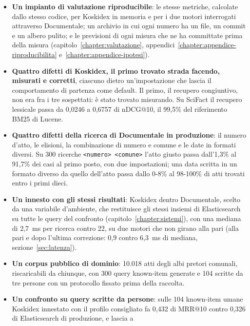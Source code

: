 \begin{itemize}
  \item \textbf{Un impianto di valutazione riproducibile}: le stesse metriche,
        calcolate dallo stesso codice, per Koskidex in memoria e per i due motori
        interrogati attraverso Documentale; un archivio in cui ogni numero ha un
        file, un commit e un albero pulito; e le previsioni di ogni misura che ne ha
        committate prima della misura (capitolo~\ref{chapter:valutazione},
        appendici~\ref{chapter:appendice-riproducibilita}
        e~\ref{chapter:appendice-ipotesi}).
  \item \textbf{Quattro difetti di Koskidex, il primo trovato strada facendo,
        misurati e corretti}, ciascuno dietro un'impostazione che lascia il
        comportamento di partenza come default. Il primo, il recupero
        congiuntivo, non era fra i tre sospettati: è stato trovato misurando.
        Su SciFact il recupero lessicale passa da 0,0246 a 0,6757 di nDCG@10,
        il 99,5\% del riferimento BM25 di Lucene.
  \item \textbf{Quattro difetti della ricerca di Documentale in produzione}:
        il numero d'atto, le elisioni, la combinazione di numero e comune e le
        date in formati diversi. Su 300 ricerche \texttt{<numero> <comune>}
        l'atto giusto passa dall'1,3\% al 91,7\% dei casi al primo posto, con
        due impostazioni; una data scritta in un formato diverso da quello
        dell'atto passa dallo 0-8\% al 98-100\% di atti trovati entro i primi
        dieci.
  \item \textbf{Un innesto con gli stessi risultati}: Koskidex dentro
        Documentale, scelto da una variabile d'ambiente, che restituisce gli
        stessi insiemi di Elasticsearch su tutte le query del confronto
        (capitolo~\ref{chapter:sistemi}), con una mediana di 2,7~ms per ricerca
        contro 22, su due motori che non girano alla pari (alla pari e dopo l'ultima correzione: 0,9 contro 6,3~ms di
        mediana, sezione~\ref{sec:latenza}).
  \item \textbf{Un corpus pubblico di dominio}: 10.018 atti degli albi pretori
        comunali, riscaricabili da chiunque, con 300 query known-item generate e
        104 scritte da tre persone con un protocollo fissato prima della
        raccolta.
  \item \textbf{Un confronto su query scritte da persone}: sulle 104
        known-item umane Koskidex innestato con il profilo consigliato fa
        0,432 di MRR@10 contro 0,326 di Elasticsearch di produzione, e lascia a

\end{itemize}
